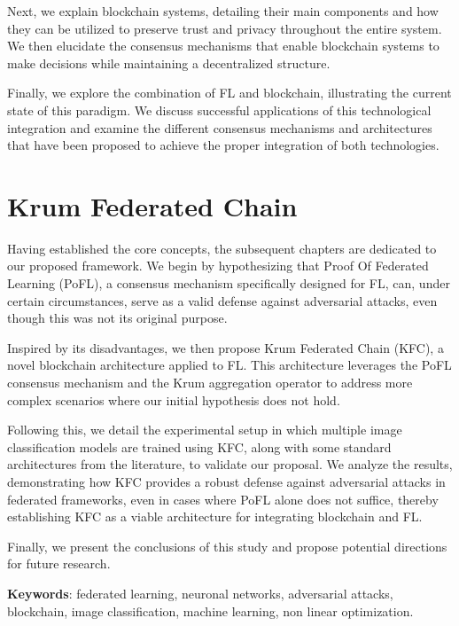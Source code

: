 Next, we explain blockchain systems, detailing their main components and how they can be utilized to preserve trust and privacy throughout the entire system. We then elucidate the consensus mechanisms that enable blockchain systems to make decisions while maintaining a decentralized structure.

Finally, we explore the combination of FL and blockchain, illustrating the current state of this paradigm. We discuss successful applications of this technological integration and examine the different consensus mechanisms and architectures that have been proposed to achieve the proper integration of both technologies.

\section*{Krum Federated Chain}
Having established the core concepts, the subsequent chapters are dedicated to our proposed framework. We begin by hypothesizing that Proof Of Federated Learning (PoFL), a consensus mechanism specifically designed for FL, can, under certain circumstances, serve as a valid defense against adversarial attacks, even though this was not its original purpose.

Inspired by its disadvantages, we then propose Krum Federated Chain (KFC), a novel blockchain architecture applied to FL. This architecture leverages the PoFL consensus mechanism and the Krum aggregation operator to address more complex scenarios where our initial hypothesis does not hold.

Following this, we detail the experimental setup in which multiple image classification models are trained using KFC, along with some standard architectures from the literature, to validate our proposal. We analyze the results, demonstrating how KFC provides a robust defense against adversarial attacks in federated frameworks, even in cases where PoFL alone does not suffice, thereby establishing KFC as a viable architecture for integrating blockchain and FL.

Finally, we present the conclusions of this study and propose potential directions for future research.

\textbf{Keywords}: federated learning, neuronal networks, adversarial attacks, blockchain, image classification, machine learning, non linear optimization.